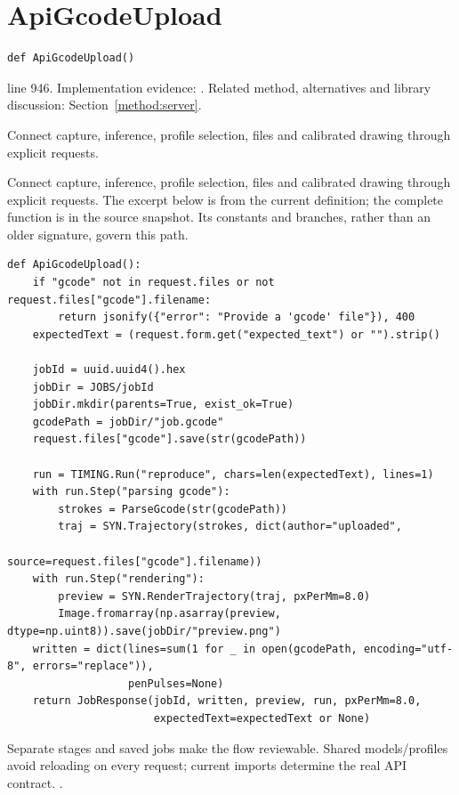 \section{ApiGcodeUpload}\label{fn:web-server:ApiGcodeUpload}
\begin{lstlisting}[style=sig]
def ApiGcodeUpload()
\end{lstlisting}
 line 946. Implementation evidence: \cite{code2026}. Related method, alternatives and library discussion: Section~\ref{method:server}.


Connect capture, inference, profile selection, files and calibrated drawing through explicit requests.


Connect capture, inference, profile selection, files and calibrated drawing through explicit requests. The excerpt below is from the current definition; the complete function is in the source snapshot. Its constants and branches, rather than an older signature, govern this path.


\begin{lstlisting}[style=plain]
def ApiGcodeUpload():
    if "gcode" not in request.files or not request.files["gcode"].filename:
        return jsonify({"error": "Provide a 'gcode' file"}), 400
    expectedText = (request.form.get("expected_text") or "").strip()

    jobId = uuid.uuid4().hex
    jobDir = JOBS/jobId
    jobDir.mkdir(parents=True, exist_ok=True)
    gcodePath = jobDir/"job.gcode"
    request.files["gcode"].save(str(gcodePath))

    run = TIMING.Run("reproduce", chars=len(expectedText), lines=1)
    with run.Step("parsing gcode"):
        strokes = ParseGcode(str(gcodePath))
        traj = SYN.Trajectory(strokes, dict(author="uploaded",
                                            source=request.files["gcode"].filename))
    with run.Step("rendering"):
        preview = SYN.RenderTrajectory(traj, pxPerMm=8.0)
        Image.fromarray(np.asarray(preview, dtype=np.uint8)).save(jobDir/"preview.png")
    written = dict(lines=sum(1 for _ in open(gcodePath, encoding="utf-8", errors="replace")),
                   penPulses=None)
    return JobResponse(jobId, written, preview, run, pxPerMm=8.0,
                       expectedText=expectedText or None)
\end{lstlisting}
Separate stages and saved jobs make the flow reviewable. Shared models/profiles avoid reloading on every request; current imports determine the real API contract. \cite{flaskdocs,pillowops,code2026}.


